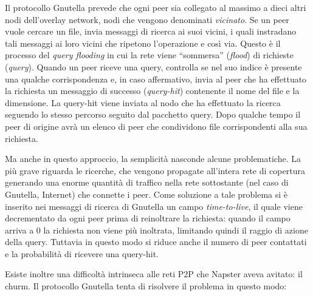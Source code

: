 Il protocollo Gnutella prevede che ogni peer sia collegato al massimo a dieci altri nodi dell'overlay network, nodi che vengono denominati \emph{vicinato}. Se un peer vuole cercare un file, invia messaggi di ricerca ai suoi vicini, i quali instradano tali messaggi ai loro vicini che ripetono l'operazione e così via. Questo è il processo del \emph{query flooding} in cui la rete viene ``sommersa'' (\emph{flood}) di richieste (\emph{query}). Quando un peer riceve una query, controlla se nel suo indice è presente una qualche corrispondenza e, in caso affermativo, invia al peer che ha effettuato la richiesta un messaggio di successo (\emph{query-hit}) contenente il nome del file e la dimensione. La query-hit viene inviata al nodo che ha effettuato la ricerca seguendo lo stesso percorso seguito dal pacchetto query. Dopo qualche tempo il peer di origine avrà un elenco di peer che condividono file corrispondenti alla sua richiesta.

Ma anche in questo approccio, la semplicità nasconde alcune problematiche. La più grave riguarda le ricerche, che vengono propagate all'intera rete di copertura generando una enorme quantità di traffico nella rete sottostante (nel caso di Gnutella, Internet) che connette i peer. Come soluzione a tale problema si è inserito nei messaggi di ricerca di Gnutella un campo \emph{time-to-live}, il quale viene decrementato da ogni peer prima di reinoltrare la richiesta: quando il campo arriva a 0 la richiesta non viene più inoltrata, limitando quindi il raggio di azione della query. Tuttavia in questo modo si riduce anche il numero di peer contattati e la probabilità di ricevere una query-hit.

Esiste inoltre una difficoltà intrinseca alle reti P2P che Napster aveva avitato: il churm. Il protocollo Gnutella tenta di risolvere il problema in questo modo:

